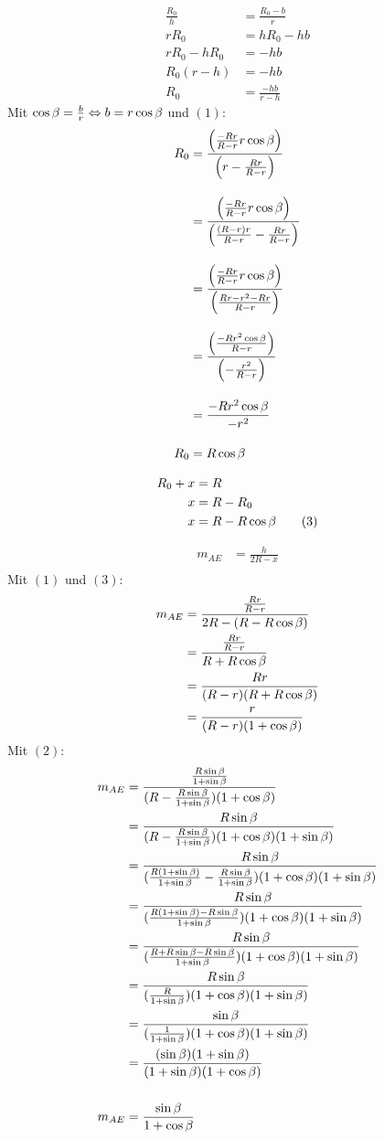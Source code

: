 \begin{align*}
	\frac{R_0}{h} &= \frac{R_0-b}{r} \\
	r R_0 &= h R_0 - hb \\
	r R_0 - h R_0 &= -hb \\
	R_0 (r-h) &= -hb \\
	R_0 &= \frac{-hb}{r-h}
\end{align*}
Mit $ \cos\beta = \frac{b}{r} \Leftrightarrow b = r \cos\beta $ und $(1)$:
\begin{align*}
	R_0 &= \frac{\left(\frac{-Rr}{R-r}r \cos\beta\right)}{\left(r-\frac{Rr}{R-r}\right)} \\[10pt]
	&= \frac{\left(\frac{-Rr}{R-r}r \cos\beta\right)}{\left(\frac{(R-r)r}{R-r}-\frac{Rr}{R-r}\right)} \\[10pt]
	&= \frac{\left(\frac{-Rr}{R-r}r \cos\beta\right)}{\left(\frac{Rr-r^2-Rr}{R-r}\right)} \\[10pt]
	&= \frac{\left(\frac{-Rr^2 \cos\beta}{R-r}\right)}{\left(-\frac{r^2}{R-r}\right)} \\[10pt]
	&= \frac{-Rr^2 \cos\beta}{-r^2} \\[10pt]
	R_0 &= R \cos\beta
\end{align*}

\begin{align*}
	R_0 + x &= R \\
	x &= R - R_0 \\
	x &= R - R \cos\beta \tag{3}
\end{align*}

\begin{samepage}
	\begin{align*}
		m_{AE} &= \frac{h}{2R - x} \\
	\end{align*}
	Mit $(1)$ und $(3)$: \nopagebreak
	\begin{align*}
		m_{AE} &= \frac{\frac{Rr}{R-r}}{2R - (R-R \cos\beta)} \\
		&= \frac{\frac{Rr}{R-r}}{R+R \cos\beta} \\
		&= \frac{Rr}{(R-r)(R+R \cos\beta)} \\
		&= \frac{r}{(R-r)(1+\cos\beta)}
	\end{align*}
	Mit $(2)$: \nopagebreak
	\begin{align*}
		m_{AE} &= \frac{\frac{R \sin\beta}{1+\sin\beta}}{(R-\frac{R \sin\beta}{1+\sin\beta})(1+\cos\beta)} \\
		&= \frac{R \sin\beta}{(R-\frac{R \sin\beta}{1+\sin\beta})(1+\cos\beta)(1+\sin\beta)} \\
		&= \frac{R \sin\beta}{(\frac{R(1+\sin\beta)}{1+\sin\beta}-\frac{R \sin\beta}{1+\sin\beta})(1+\cos\beta)(1+\sin\beta)} \\
		&= \frac{R \sin\beta}{(\frac{R(1+\sin\beta) - R\sin\beta}{1+\sin\beta})(1+\cos\beta)(1+\sin\beta)} \\
		&= \frac{R \sin\beta}{(\frac{R+R\sin\beta-R\sin\beta}{1+\sin\beta})(1+\cos\beta)(1+\sin\beta)} \\
		&= \frac{R \sin\beta}{(\frac{R}{1+\sin\beta})(1+\cos\beta)(1+\sin\beta)} \\
		&= \frac{\sin\beta}{(\frac{1}{1+\sin\beta})(1+\cos\beta)(1+\sin\beta)} \\
		&= \frac{(\sin\beta)(1+\sin\beta)}{(1+\sin\beta)(1+\cos\beta)} \\[15pt]
		m_{AE} &= \frac{\sin\beta}{1+\cos\beta}
	\end{align*}
\end{samepage}

